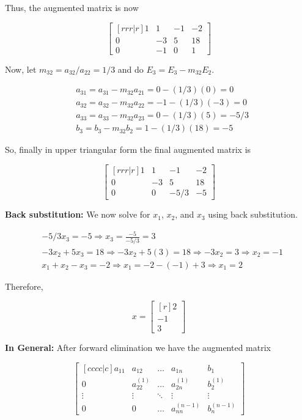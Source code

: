 \documentclass [titlepage,12pt,letter] {article}
\begin{document}
Thus, the augmented matrix is now

\[
\begin{bmatrix}[rrr|r]
    1 & 1 & -1 & -2 \\
    0 & -3 & 5 & 18 \\
    0 & -1 & 0 & 1
\end{bmatrix}
\]

Now, let $m_{32}=a_{32}/a_{22}=1/3$ and do $E_3=E_3-m_{32}E_2$.

\begin{align*} 
&a_{31}=a_{31}-m_{32}a_{21}=0-(1/3)(0)=0 \\
&a_{32}=a_{32}-m_{32}a_{22}=-1-(1/3)(-3)=0 \\
&a_{33}=a_{33}-m_{32}a_{23}=0-(1/3)(5)=-5/3 \\
&b_3=b_3-m_{32}b_2=1-(1/3)(18)=-5
\end{align*}

So, finally in upper triangular form the final augmented matrix is

\[
\begin{bmatrix}[rrr|r]
    1 & 1 & -1 & -2 \\
    0 & -3 & 5 & 18 \\
    0 & 0 & -5/3 & -5
\end{bmatrix}
\]

{\bf Back substitution:}
We now solve for $x_1$, $x_2$, and $x_3$ using back substitution.

\begin{align*} 
&-5/3x_3=-5 \Rightarrow x_3=\frac{-5}{-5/3}=3 \\
&-3x_2+5x_3=18 \Rightarrow -3x_2+5(3)=18 \Rightarrow -3x_2=3 \Rightarrow x_2=-1 \\
&x_1+x_2-x_3=-2 \Rightarrow x_1=-2-(-1)+3 \Rightarrow x_1=2
\end{align*}

Therefore,

\[
x =
\begin{bmatrix}[r]
    2 \\
    -1 \\
    3
\end{bmatrix}
\]

{\bf In General:}
After forward elimination we have the augmented matrix

\[
\begin{bmatrix}[cccc|c]
    a_{11}       & a_{12} & \dots & a_{1n} & b_1 \\
    0       & a_{22}^{(1)} & \dots & a_{2n}^{(1)} & b_2^{(1)} \\
    \vdots & \vdots & \ddots & \vdots & \vdots \\
    0       & 0 & \dots & a_{nn}^{(n-1)} & b_n^{(n-1)}
\end{bmatrix}
\]
\end{document}
